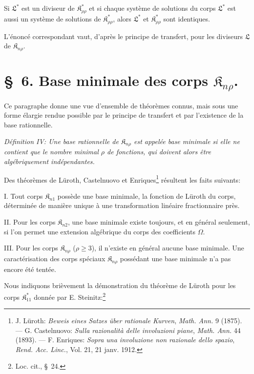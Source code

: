 \documentclass[11pt]{article}
\providecommand{\Kfield}{\mathfrak{K}}
\begin{document}
\og{}Si $\mathfrak{L}^*$ est un diviseur de $\Kfield^*_{\rho\rho}$ et si chaque système de solutions du corps $\mathfrak{L}^*$ est aussi un système de solutions de $\Kfield^*_{\rho\rho}$, alors $\mathfrak{L}^*$ et $\Kfield^*_{\rho\rho}$ sont identiques.\fg{}

L'énoncé correspondant vaut, d'après le principe de transfert, pour les diviseurs $\mathfrak{L}$ de $\Kfield_{n\rho}$.

\section*{\S\ 6. Base minimale des corps $\Kfield_{n\rho}$.}

Ce paragraphe donne une vue d'ensemble de théorèmes connus, mais sous une forme élargie rendue possible par le principe de transfert et par l'existence de la base rationnelle.

\emph{Définition IV: Une base rationnelle de $\Kfield_{n\rho}$ est appelée base minimale si elle ne contient que le nombre minimal $\rho$ de fonctions, qui doivent alors être algébriquement indépendantes.}

Des théorèmes de Lüroth, Castelnuovo et Enriques\footnote{J. Lüroth: \emph{Beweis eines Satzes über rationale Kurven}, \emph{Math. Ann.} 9 (1875). --- G. Castelnuovo: \emph{Sulla razionalità delle involuzioni piane}, \emph{Math. Ann.} 44 (1893). --- F. Enriques: \emph{Sopra una involuzione non razionale dello spazio}, \emph{Rend. Acc. Linc.}, Vol. 21, 21 janv. 1912.} résultent les faits suivants:

I. Tout corps $\Kfield_{n1}$ possède une base minimale, la fonction de Lüroth du corps, déterminée de manière unique à une transformation linéaire fractionnaire près.

II. Pour les corps $\Kfield_{n2}$, une base minimale existe toujours, et en général seulement, si l'on permet une extension algébrique du corps des coefficients $\Omega$.

III. Pour les corps $\Kfield_{n\rho}$ ($\rho\ge3$), il n'existe en général aucune base minimale. Une caractérisation des corps spéciaux $\Kfield_{n\rho}$ possédant une base minimale n'a pas encore été tentée.

Nous indiquons brièvement la démonstration du théorème de Lüroth pour les corps $\Kfield^*_{11}$ donnée par E. Steinitz:\footnote{Loc. cit., \S\ 24.}
\end{document}

